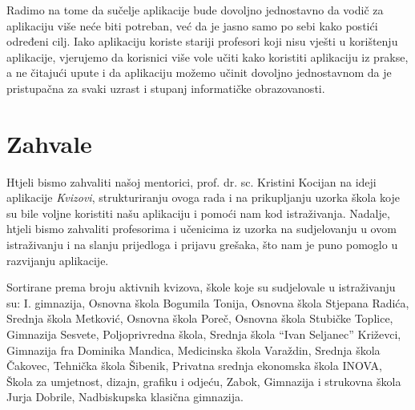 \documentclass{scrreprt}
\begin{document}
Radimo na tome da sučelje aplikacije bude dovoljno jednostavno da vodič za
aplikaciju više neće biti potreban, već da je jasno samo po sebi kako postići
određeni cilj. Iako aplikaciju koriste stariji profesori koji nisu vješti u
korištenju aplikacije, vjerujemo da korisnici više vole učiti kako koristiti
aplikaciju iz prakse, a ne čitajući upute i da aplikaciju možemo učinit dovoljno
jednostavnom da je pristupačna za svaki uzrast i stupanj informatičke
obrazovanosti.

\chapter{Zahvale}

Htjeli bismo zahvaliti našoj mentorici, prof. dr. sc. Kristini Kocijan na ideji
aplikacije \emph{Kvizovi}, strukturiranju ovoga rada i na prikupljanju uzorka
škola koje su bile voljne koristiti našu aplikaciju i pomoći nam kod
istraživanja. Nadalje, htjeli bismo zahvaliti profesorima i učenicima iz uzorka
na sudjelovanju u ovom istraživanju i na slanju prijedloga i prijavu grešaka,
što nam je puno pomoglo u razvijanju aplikacije.

Sortirane prema broju aktivnih kvizova, škole koje su sudjelovale u istraživanju
su: I. gimnazija, Osnovna škola Bogumila Tonija, Osnovna škola Stjepana Radića,
Srednja škola Metković, Osnovna škola Poreč, Osnovna škola Stubičke Toplice,
Gimnazija Sesvete, Poljoprivredna škola, Srednja škola ``Ivan Seljanec''
Križevci, Gimnazija fra Dominika Mandica, Medicinska škola Varaždin, Srednja
škola Čakovec, Tehnička škola Šibenik, Privatna srednja ekonomska škola INOVA,
Škola za umjetnost, dizajn, grafiku i odjeću, Zabok, Gimnazija i strukovna
škola Jurja Dobrile, Nadbiskupska klasična gimnazija.

\renewcommand{\listoffigures}{\begingroup
\tocchapter
{}
\endgroup}

\listoffigures

\renewcommand{\bibname}{Popis literature}
\end{document}
